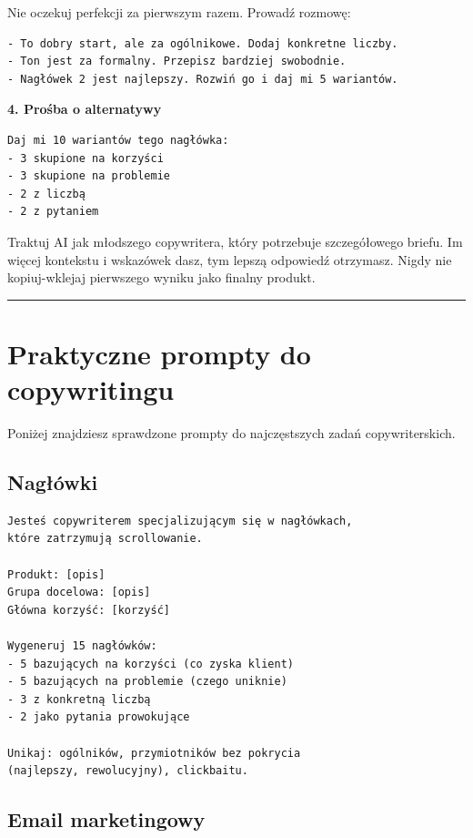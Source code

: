 \documentclass[
  12pt,
  a4paper,
  twoside,
  openright,
  12pt,
  DIV=12,
  BCOR=12mm]{scrbook}
\newcommand{\decoline}{%
  \begin{center}
    \textcolor{bordergray}{\rule{0.3\textwidth}{0.5pt}}
  \end{center}
}
\begin{document}
Nie oczekuj perfekcji za pierwszym razem. Prowadź rozmowę:

\begin{verbatim}
- To dobry start, ale za ogólnikowe. Dodaj konkretne liczby.
- Ton jest za formalny. Przepisz bardziej swobodnie.
- Nagłówek 2 jest najlepszy. Rozwiń go i daj mi 5 wariantów.
\end{verbatim}

\textbf{4. Prośba o alternatywy}

\begin{verbatim}
Daj mi 10 wariantów tego nagłówka:
- 3 skupione na korzyści
- 3 skupione na problemie
- 2 z liczbą
- 2 z pytaniem
\end{verbatim}

\begin{wskazowka}
Traktuj AI jak młodszego copywritera, który potrzebuje szczegółowego briefu. Im więcej kontekstu i wskazówek dasz, tym lepszą odpowiedź otrzymasz. Nigdy nie kopiuj-wklejaj pierwszego wyniku jako finalny produkt.
\end{wskazowka}

\decoline

\section{Praktyczne prompty do
copywritingu}\label{praktyczne-prompty-do-copywritingu}

Poniżej znajdziesz sprawdzone prompty do najczęstszych zadań
copywriterskich.

\subsection{Nagłówki}\label{nagux142uxf3wki-1}

\begin{verbatim}
Jesteś copywriterem specjalizującym się w nagłówkach, 
które zatrzymują scrollowanie.

Produkt: [opis]
Grupa docelowa: [opis]
Główna korzyść: [korzyść]

Wygeneruj 15 nagłówków:
- 5 bazujących na korzyści (co zyska klient)
- 5 bazujących na problemie (czego uniknie)
- 3 z konkretną liczbą
- 2 jako pytania prowokujące

Unikaj: ogólników, przymiotników bez pokrycia 
(najlepszy, rewolucyjny), clickbaitu.
\end{verbatim}

\subsection{Email marketingowy}\label{email-marketingowy}
\end{document}
